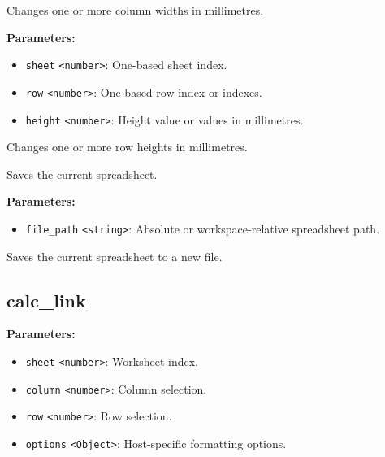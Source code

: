 \documentclass[12pt,a4paper]{article}
\begin{document}
\noindent Changes one or more column widths in millimetres.

\vspace{5mm}
\noindent {}


\noindent \textbf{Parameters:}
\begin{itemize}
  \item \texttt{sheet} \texttt{<number>}: One-based sheet index.
  \item \texttt{row} \texttt{<number>}: One-based row index or indexes.
  \item \texttt{height} \texttt{<number>}: Height value or values in millimetres.
\end{itemize}

\noindent Changes one or more row heights in millimetres.

\vspace{5mm}
\noindent {}


\noindent Saves the current spreadsheet.

\vspace{5mm}
\noindent {}


\noindent \textbf{Parameters:}
\begin{itemize}
  \item \texttt{file\_path} \texttt{<string>}: Absolute or workspace-relative spreadsheet path.
\end{itemize}

\noindent Saves the current spreadsheet to a new file.


\subsection{calc\_link}
\vspace{5mm}
\noindent {}


\noindent \textbf{Parameters:}
\begin{itemize}
  \item \texttt{sheet} \texttt{<number>}: Worksheet index.
  \item \texttt{column} \texttt{<number>}: Column selection.
  \item \texttt{row} \texttt{<number>}: Row selection.
  \item \texttt{options} \texttt{<Object>}: Host-specific formatting options.
\end{itemize}
\end{document}
